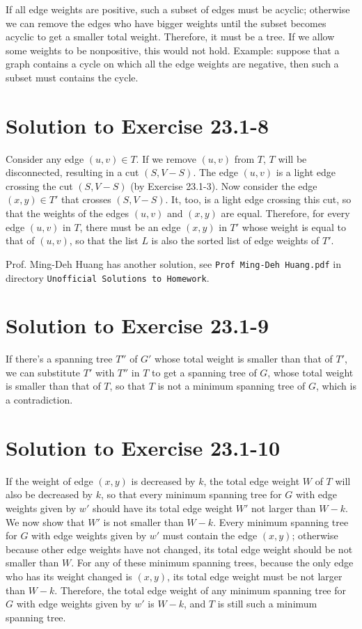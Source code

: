 \documentclass[a4paper, fleqn]{article}
\begin{document}
If all edge weights are positive, such a subset of edges must be acyclic; otherwise we can remove the edges who have bigger weights until the subset becomes acyclic to get a smaller total weight. Therefore, it must be a tree. If we allow some weights to be nonpositive, this would not hold. Example: suppose that a graph contains a cycle on which all the edge weights are negative, then such a subset must contains the cycle.


\section*{Solution to Exercise 23.1-8}

Consider any edge $(u, v) \in T$. If we remove $(u, v)$ from $T$, $T$ will be disconnected, resulting in a cut $(S, V - S)$. The edge $(u, v)$ is a light edge crossing the cut $(S, V - S)$ (by Exercise 23.1-3). Now consider the edge $(x, y) \in T'$ that crosses $(S, V - S)$. It, too, is a light edge crossing this cut, so that the weights of the edges $(u, v)$ and $(x, y)$ are equal. Therefore, for every edge $(u, v)$ in $T$, there must be an edge $(x, y)$ in $T'$ whose weight is equal to that of $(u, v)$, so that the list $L$ is also the sorted list of edge weights of $T'$.

Prof. Ming-Deh Huang has another solution, see \texttt{Prof Ming-Deh Huang.pdf} in directory \texttt{Unofficial Solutions to Homework}.


\section*{Solution to Exercise 23.1-9}

If there's a spanning tree $T''$ of $G'$ whose total weight is smaller than that of $T'$, we can substitute $T'$ with $T''$ in $T$ to get a spanning tree of $G$, whose total weight is smaller than that of $T$, so that $T$ is not a minimum spanning tree of $G$, which is a contradiction.


\section*{Solution to Exercise 23.1-10}

If the weight of edge $(x, y)$ is decreased by $k$, the total edge weight $W$ of $T$ will also be decreased by $k$, so that every minimum spanning tree for $G$ with edge weights given by $w'$ should have its total edge weight $W'$ not larger than $W - k$. We now show that $W'$ is not smaller than $W - k$. Every minimum spanning tree for $G$ with edge weights given by $w'$ must contain the edge $(x, y)$; otherwise because other edge weights have not changed, its total edge weight should be not smaller than $W$. For any of these minimum spanning trees, because the only edge who has its weight changed is $(x, y)$, its total edge weight must be not larger than $W - k$. Therefore, the total edge weight of any minimum spanning tree for $G$ with edge weights given by $w'$ is $W - k$, and $T$ is still such a minimum spanning tree.
\end{document}

